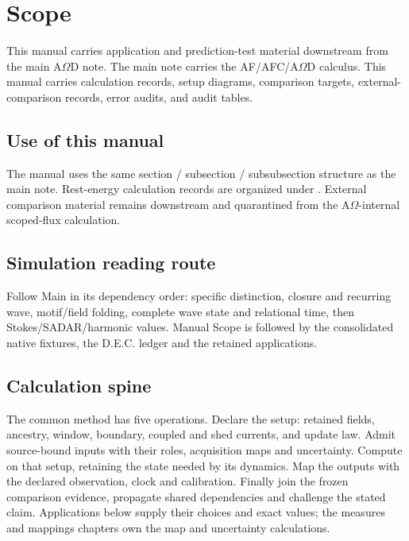 
\section{Scope}\label{manual:scope}
This manual carries application and prediction-test material downstream from the main A\(\Omega\)D note. The main note carries the AF/AFC/A\(\Omega\)D calculus. This manual carries calculation records, setup diagrams, comparison targets, external-comparison records, error audits, and audit tables.

\subsection{Use of this manual}\label{manual:scope:use}
The manual uses the same section / subsection / subsubsection structure as the main note. Rest-energy calculation records are organized under . External comparison material remains downstream and quarantined from the A\(\Omega\)-internal scoped-flux calculation.


\subsection{Simulation reading route}\label{manual:simulation-reading-route}
Follow Main in its dependency order: specific distinction, closure and recurring wave, motif/field folding, complete wave state and relational time, then Stokes/SADAR/harmonic values. Manual Scope is followed by the consolidated native fixtures, the D.E.C. ledger and the retained applications.





\subsection{Calculation spine}\label{manual:calculation-spine}

The common method has five operations. Declare the setup: retained fields,
ancestry, window, boundary, coupled and shed currents, and update law. Admit
source-bound inputs with their roles, acquisition maps and uncertainty.
Compute on that setup, retaining the state needed by its dynamics. Map the
outputs with the declared observation, clock and calibration. Finally join
the frozen comparison evidence, propagate shared dependencies and challenge
the stated claim. Applications below supply their choices and exact values;
the measures and mappings chapters own the map and uncertainty calculations.


